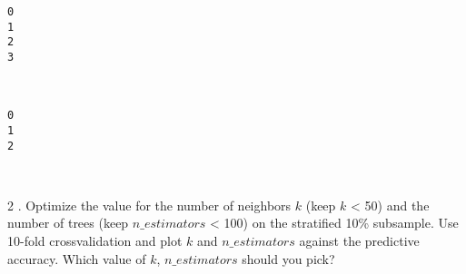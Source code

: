\documentclass[11pt]{article}
\begin{document}
    \begin{Verbatim}[commandchars=\\\{\}]
0
1
2
3

    \end{Verbatim}

    \begin{center}
    \end{center}
    { \hspace*{\fill} \\}
    
    \begin{Verbatim}[commandchars=\\\{\}]
0
1
2

    \end{Verbatim}

    \begin{center}
    \end{center}
    { \hspace*{\fill} \\}
    
    2 . Optimize the value for the number of neighbors \(k\) (keep \(k\)
\textless{} 50) and the number of trees (keep \(n\_estimators\)
\textless{} 100) on the stratified 10\% subsample. Use 10-fold
crossvalidation and plot \(k\) and \(n\_estimators\) against the
predictive accuracy. Which value of \(k\), \(n\_estimators\) should you
pick?
\end{document}
